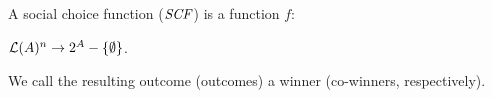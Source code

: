 \begin{definition}
	A social choice function ($\it{SCF}$) is a function $f$:
	\begin{center}
		$\mathcal{L}(A)^n \rightarrow 2^A-\{\emptyset\}$.
	\end{center}
	We call the resulting outcome (outcomes)
	a winner (co-winners, respectively).
\end{definition}



%
%
%
%
%

